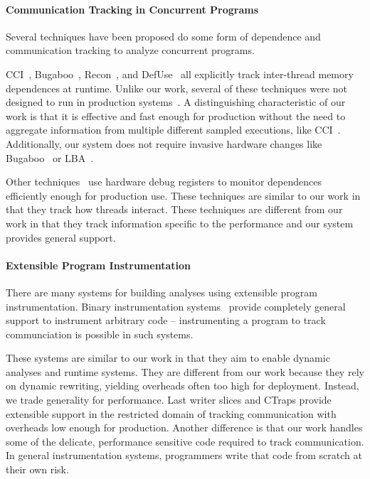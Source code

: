 \documentclass[preprint,9pt]{sigplanconf}
\newcommand{\ctraps}{CTraps\xspace}
\begin{document}
\paragraph{Communication Tracking in Concurrent Programs}
Several techniques have been proposed do some form of dependence and
communication tracking to analyze concurrent programs.  

CCI~\cite{cci}, Bugaboo~\cite{bugaboo}, Recon~\cite{recon}, and
DefUse~\cite{defuse} all explicitly track inter-thread memory dependences at
runtime.  Unlike our work, several of these techniques were not designed to run
in production systems~\cite{recon,defuse}.  A distinguishing characteristic of
our work is that it is effective and fast enough for production without the
need to aggregate information from multiple different sampled executions, like
CCI~\cite{cci}.  Additionally, our system does not require invasive hardware
changes like Bugaboo~\cite{bugaboo} or LBA~\cite{paralog}.

Other techniques~\cite{threadclustering,threadcriticality} use  hardware debug
registers to monitor dependences efficiently enough for production use.  These
techniques are similar to our work in that they track how threads interact.
These techniques are different from our work in that they track information
specific to the performance and our system provides general support.

\paragraph{Extensible Program Instrumentation}
There are many systems for building analyses using extensible program
instrumentation.  Binary instrumentation
systems~\cite{pin,dynamorio,valgrind,roadrunner} provide completely general
support to instrument arbitrary code -- instrumenting a program to track
communciation is possible in such systems.  

These systems are similar to our work in that they aim to enable dynamic
analyses and runtime systems.  They are different from our work because they
rely on dynamic rewriting, yielding overheads often too high for deployment.
Instead, we trade generality for performance. Last writer slices and \ctraps
provide extensible support in the restricted domain of tracking communication
with overheads low enough for production.  Another difference is that our work
handles some of the delicate, performance sensitive code required to track
communication.  In general instrumentation systems, programmers write that code
from scratch at their own risk.  
\end{document}
